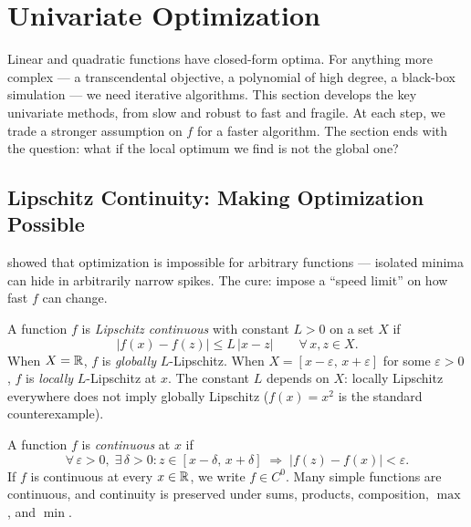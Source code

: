 \section{Univariate Optimization}\label{sec:univariate}

Linear and quadratic functions have closed-form optima.
For anything more complex --- a transcendental objective, a polynomial of high degree, a black-box simulation --- we need iterative algorithms.
This section develops the key univariate methods, from slow and robust to fast and fragile. At each step, we trade a stronger assumption on $f$ for a faster algorithm. The section ends with the question: what if the local optimum we find is not the global one?


\subsection{Lipschitz Continuity: Making Optimization Possible}\label{ssec:lipschitz}

 showed that optimization is impossible for arbitrary functions --- isolated minima can hide in arbitrarily narrow spikes.
The cure: impose a ``speed limit'' on how fast $f$ can change.

\begin{defn}\label{def:lipschitz}
	A function $f$ is \textit{Lipschitz continuous} with constant $L > 0$ on a set $X$ if
	\begin{equation}\label{eq:lipschitz-condition}
		|f(x) - f(z)| \leq L\, |x - z| \qquad \forall\, x, z \in X.
	\end{equation}
	When $X = \mathbb{R}$, $f$ is \textit{globally} $L$-Lipschitz.
	When $X = [x - \varepsilon,\, x + \varepsilon]$ for some $\varepsilon > 0$, $f$ is \textit{locally} $L$-Lipschitz at $x$.
	The constant $L$ depends on $X$: locally Lipschitz everywhere does not imply globally Lipschitz ($f(x) = x^2$ is the standard counterexample).
\end{defn}

\begin{defn}[Continuity]\label{def:continuity}
	A function $f$ is \textit{continuous} at $x$ if
	\begin{equation}\label{eq:continuity}
		\forall\, \varepsilon > 0,\; \exists\, \delta > 0 :
		z \in [x - \delta,\, x + \delta]
		\;\Rightarrow\; |f(z) - f(x)| < \varepsilon.
	\end{equation}
	If $f$ is continuous at every $x \in \mathbb{R}$, we write $f \in C^0$.
	Many simple functions are continuous, and continuity is preserved under sums, products, composition, $\max$, and $\min$.
\end{defn}

